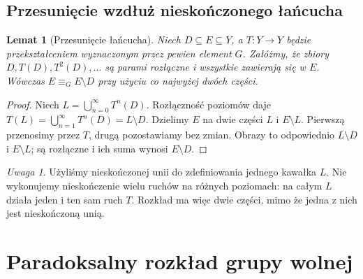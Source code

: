 \documentclass[11pt,a4paper]{article}
\numberwithin{equation}{section}
\theoremstyle{plain}
\newtheorem{lemat}[twierdzenie]{Lemat}
\theoremstyle{definition}
\theoremstyle{remark}
\newtheorem{uwaga}[twierdzenie]{Uwaga}
\newcommand{\equivG}{\mathrel{\equiv_G}}
\begin{document}
\subsection{Przesunięcie wzdłuż nieskończonego łańcucha}
\begin{lemat}[Przesunięcie łańcucha]\label{lem:lancuch}
Niech $D\subseteq E\subseteq Y$, a $T:Y\to Y$ będzie przekształceniem wyznaczonym przez pewien element $G$. Załóżmy, że zbiory $D,T(D),T^2(D),\ldots$ są parami rozłączne i wszystkie zawierają się w $E$. Wówczas $E\equivG E\setminus D$ przy użyciu co najwyżej dwóch części.
\end{lemat}
\begin{proof}
Niech $L=\bigcup_{n=0}^{\infty}T^n(D)$. Rozłączność poziomów daje $T(L)=\bigcup_{n=1}^{\infty}T^n(D)=L\setminus D$. Dzielimy $E$ na dwie części $L$ i $E\setminus L$. Pierwszą przenosimy przez $T$, drugą pozostawiamy bez zmian. Obrazy to odpowiednio $L\setminus D$ i $E\setminus L$; są rozłączne i ich suma wynosi $E\setminus D$.
\end{proof}
\begin{uwaga}
Użyliśmy nieskończonej unii do zdefiniowania jednego kawałka $L$. Nie wykonujemy nieskończenie wielu ruchów na różnych poziomach: na całym $L$ działa jeden i ten sam ruch $T$. Rozkład ma więc dwie części, mimo że jedna z nich jest nieskończoną unią.
\end{uwaga}

\section{Paradoksalny rozkład grupy wolnej}
\end{document}
